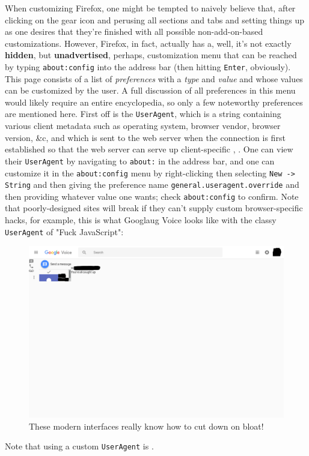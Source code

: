 \documentclass{article}
\begin{document}
When customizing Firefox, one might be tempted to naively believe that, after clicking on the gear icon and perusing all sections and tabs and setting things up as one desires that they're finished with all possible non-add-on-based customizations.  However, Firefox, in fact, actually has a, well, it's not exactly \textbf{hidden}, but \textbf{unadvertised}, perhaps, customization menu that can be reached by typing \texttt{about:config} into the address bar (then hitting \texttt{Enter}, obviously).  This page consists of a list of \textit{preferences} with a \textit{type} and \textit{value} and whose values can be customized by the user.  A full discussion of all preferences in this menu would likely require an entire encyclopedia, so only a few noteworthy preferences are mentioned here.  First off is the \texttt{UserAgent}, which is a string containing various client metadata such as operating system, browser vendor, browser version, \&c, and which is sent to the web server when the connection is first established so that the web server can serve up client-specific , .  One can view their \texttt{UserAgent} by navigating to \texttt{about:} in the address bar, and one can customize it in the \texttt{about:config} menu by right-clicking then selecting \texttt{New -> String} and then giving the preference name \texttt{general.useragent.override} and then providing whatever value one wants; check \texttt{about:config} to confirm.  Note that poorly-designed sites will break if they can't supply custom browser-specific hacks, for example, this is what Googlaug Voice looks like with the classy \texttt{UserAgent} of "Fuck JavaScript":
\begin{figure}
\includegraphics[scale=0.33]{files/blog/2018_01_17_better_browsing_with_firefox/2018_01_17_googlaug_voice.png}
\caption{These modern interfaces really know how to cut down on bloat!}
\end{figure}
Note that using a custom \texttt{UserAgent} is .
\end{document}
